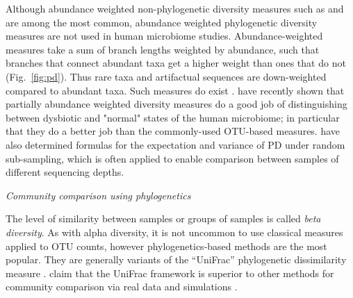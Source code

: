 \documentclass{amsart}
\renewcommand{\subsection}[1]{%
\bigskip
\begin{center}
\begin{large}
\normalfont\itshape #1
\end{large}
\end{center}}
\begin{document}
Although abundance weighted non-phylogenetic diversity measures such as \citet{simpson1949measurement} and \citet{shannon1948mathematical} are among the most common, abundance weighted phylogenetic diversity measures are not used in human microbiome studies.
Abundance-weighted measures take a sum of branch lengths weighted by abundance, such that branches that connect abundant taxa get a higher weight than ones that do not (Fig.~\ref{fig:pd}).
Thus rare taxa and artifactual sequences are down-weighted compared to abundant taxa.
Such measures do exist \citep{rao1982diversity,barker2002phylogenetic,allen2009new,chao2010phylogenetic,vellend2011measuring}.
\citet{mccoy2013abundance} have recently shown that partially abundance weighted diversity measures do a good job of distinguishing between dysbiotic and "normal" states of the human microbiome; in particular that they do a better job than the commonly-used OTU-based measures.
\citet{nipperess2013mean} have also determined formulas for the expectation and variance of PD under random sub-sampling, which is often applied to enable comparison between samples of different sequencing depths.


\subsection{Community comparison using phylogenetics}

The level of similarity between samples or groups of samples is called \emph{beta diversity}.
As with alpha diversity, it is not uncommon to use classical measures \citep[e.g.][]{jaccard1908nouvelles} applied to OTU counts, however phylogenetics-based methods are the most popular.
They are generally variants of the ``UniFrac'' phylogenetic dissimilarity measure \citep[as described and named by][]{LozuponeKnightUniFrac05}.
\citet{kuczynski2010microbial} claim that the UniFrac framework is superior to other methods for community comparison via real data and simulations \citep[for a contrary viewpoint using simulations see][]{schloss2008evaluating}.
\end{document}

